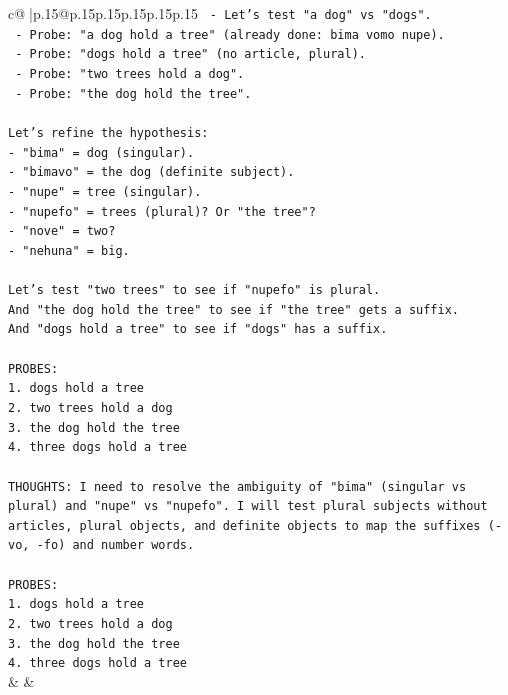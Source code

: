 \documentclass{article}
\begin{document}
{\begin{supertabular}{c@{$\;$}|p{.15\linewidth}@{}p{.15\linewidth}p{.15\linewidth}p{.15\linewidth}p{.15\linewidth}p{.15\linewidth}}
{{{\texttt{   {-} Let's test "a dog" vs "dogs".} \\
\texttt{   {-} Probe: "a dog hold a tree" (already done: bima vomo nupe).} \\
\texttt{   {-} Probe: "dogs hold a tree" (no article, plural).} \\
\texttt{   {-} Probe: "two trees hold a dog".} \\
\texttt{   {-} Probe: "the dog hold the tree".} \\
\\ 
\texttt{Let's refine the hypothesis:} \\
\texttt{{-} "bima" = dog (singular).} \\
\texttt{{-} "bimavo" = the dog (definite subject).} \\
\texttt{{-} "nupe" = tree (singular).} \\
\texttt{{-} "nupefo" = trees (plural)? Or "the tree"?} \\
\texttt{{-} "nove" = two?} \\
\texttt{{-} "nehuna" = big.} \\
\\ 
\texttt{Let's test "two trees" to see if "nupefo" is plural.} \\
\texttt{And "the dog hold the tree" to see if "the tree" gets a suffix.} \\
\texttt{And "dogs hold a tree" to see if "dogs" has a suffix.} \\
\\ 
\texttt{PROBES:} \\
\texttt{1. dogs hold a tree} \\
\texttt{2. two trees hold a dog} \\
\texttt{3. the dog hold the tree} \\
\texttt{4. three dogs hold a tree} \\
\\ 
\texttt{THOUGHTS: I need to resolve the ambiguity of "bima" (singular vs plural) and "nupe" vs "nupefo". I will test plural subjects without articles, plural objects, and definite objects to map the suffixes ({-}vo, {-}fo) and number words.} \\
\\ 
\texttt{PROBES:} \\
\texttt{1. dogs hold a tree} \\
\texttt{2. two trees hold a dog} \\
\texttt{3. the dog hold the tree} \\
\texttt{4. three dogs hold a tree} \\
            }
        }
    }
    & & \\ \\


\end{supertabular}}
\end{document}
